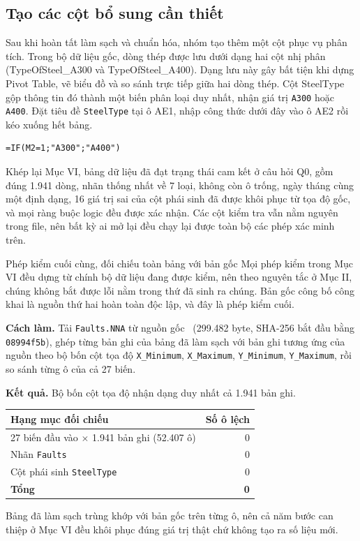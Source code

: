 \documentclass[12pt]{article}
\begin{document}
\subsection{Tạo các cột bổ sung cần thiết}
Sau khi hoàn tất làm sạch và chuẩn hóa, nhóm tạo thêm một cột phục vụ phân tích. Trong bộ dữ liệu gốc, dòng thép được lưu dưới dạng hai cột nhị phân (TypeOfSteel\_A300 và TypeOfSteel\_A400). Dạng lưu này gây bất tiện khi dựng Pivot Table, vẽ biểu đồ và so sánh trực tiếp giữa hai dòng thép. Cột SteelType gộp thông tin đó thành một biến phân loại duy nhất, nhận giá trị \texttt{A300} hoặc \texttt{A400}. Đặt tiêu đề \texttt{SteelType} tại ô AE1, nhập công thức dưới đây vào ô AE2 rồi kéo xuống hết bảng.

\begin{aivncodebox}[ô AE2]
  \begin{lstlisting}[language=Excel]
=IF(M2=1;"A300";"A400")\end{lstlisting}
  \end{aivncodebox}

\noindent
Khép lại Mục VI, bảng dữ liệu đã đạt trạng thái cam kết ở câu hỏi Q0, gồm đúng 1.941 dòng, nhãn thống nhất về 7 loại, không còn ô trống, ngày tháng cùng một định dạng, 16 giá trị sai của cột phái sinh đã được khôi phục từ tọa độ gốc, và mọi ràng buộc logic đều được xác nhận. Các cột kiểm tra vẫn nằm nguyên trong file, nên bất kỳ ai mở lại đều chạy lại được toàn bộ các phép xác minh trên.

\begin{examplebox}{Phép kiểm cuối cùng, đối chiếu toàn bảng với bản gốc}
Mọi phép kiểm trong Mục VI đều dựng từ chính bộ dữ liệu đang được kiểm, nên theo nguyên tắc ở Mục II, chúng không bắt được lỗi nằm trong thứ đã sinh ra chúng. Bản gốc công bố công khai là nguồn thứ hai hoàn toàn độc lập, và đây là phép kiểm cuối.

\textbf{Cách làm.} Tải \texttt{Faults.NNA} từ nguồn gốc~\cite{steelplates2010} (299.482 byte, SHA-256 bắt đầu bằng \texttt{08994f5b}), ghép từng bản ghi của bảng đã làm sạch với bản ghi tương ứng của nguồn theo bộ bốn cột tọa độ \texttt{X\_Minimum}, \texttt{X\_Maximum}, \texttt{Y\_Minimum}, \texttt{Y\_Maximum}, rồi so sánh từng ô của cả 27 biến.

\textbf{Kết quả.} Bộ bốn cột tọa độ nhận dạng duy nhất cả 1.941 bản ghi.

\begin{center}
\small
\begin{tabular}{@{}p{7.4cm} r@{}}
\toprule
\textbf{Hạng mục đối chiếu} & \textbf{Số ô lệch} \\
\midrule
27 biến đầu vào $\times$ 1.941 bản ghi (52.407 ô) & 0 \\
Nhãn \texttt{Faults} & 0 \\
Cột phái sinh \texttt{SteelType} & 0 \\
\midrule
\textbf{Tổng} & \textbf{0} \\
\bottomrule
\end{tabular}
\end{center}

Bảng đã làm sạch trùng khớp với bản gốc trên từng ô, nên cả năm bước can thiệp ở Mục VI đều khôi phục đúng giá trị thật chứ không tạo ra số liệu mới.
\end{examplebox}
\end{document}
